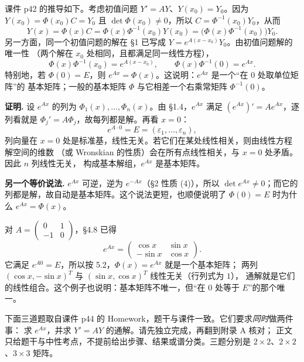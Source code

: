 \documentclass[11pt]{ctexart}
\newcommand{\pmat}[1]{\begin{pmatrix}#1\end{pmatrix}}
\begin{document}
课件 p42 的推导如下。考虑初值问题 $Y'=AY$、$Y(x_0)=Y_0$。因为
$Y(x_0)=\Phi(x_0)C=Y_0$ 且 $\det\Phi(x_0)\ne0$，所以 $C=\Phi^{-1}(x_0)Y_0$，从而
\[
Y(x)=\Phi(x)C=\Phi(x)\Phi^{-1}(x_0)Y(x_0)
=\bigl(\Phi(x)\Phi^{-1}(x_0)\bigr)Y_0 .
\]
另一方面，同一个初值问题的解在 §1 已写成 $Y=e^{A(x-x_0)}Y_0$。由初值问题解的唯一性
（两个解在 $x_0$ 处相同，且都满足同一线性方程），
\begin{equation}\label{eq:PhiExp}
\Phi(x)\Phi^{-1}(x_0)=e^{A(x-x_0)},\qquad
\Phi(x)\Phi^{-1}(0)=e^{Ax}.
\end{equation}
特别地，若 $\Phi(0)=E$，则 $e^{Ax}=\Phi(x)$。这说明：$e^{Ax}$ 是一个“在 $0$ 处取单位矩阵”的
基本矩阵；一般的基本矩阵 $\Phi$ 与它相差一个右乘常矩阵 $\Phi^{-1}(0)$。



\textbf{证明.} 设 $e^{Ax}$ 的列为 $\Phi_1(x),\dots,\Phi_n(x)$。由 §1.4，$e^{Ax}$ 满足
$(e^{Ax})'=Ae^{Ax}$，逐列看就是 $\Phi_j'=A\Phi_j$，故每列都是解。再看 $x=0$：
\[
e^{A\cdot0}=E=(\varepsilon_1,\dots,\varepsilon_n),
\]
列向量在 $x=0$ 处是标准基，线性无关。若它们在某处线性相关，则由线性方程解空间的维数
（或 Wronskian 的性质）会在所有点线性相关，与 $x=0$ 处矛盾。因此 $n$ 列线性无关，
构成基本解组，$e^{Ax}$ 是基本矩阵。

\textbf{另一个等价说法.} $e^{Ax}$ 可逆，逆为 $e^{-Ax}$（§2 性质 (4)），所以
$\det e^{Ax}\ne0$；而它的列都是解，故自动是基本矩阵。这个说法更短，也顺便说明了
$\Phi(0)=E$ 时为什么 $e^{Ax}=\Phi(x)$。


对 $A=\pmat{0&1\\-1&0}$，§4.8 已得
\[
e^{Ax}=\pmat{\cos x&\sin x\\-\sin x&\cos x}.
\]
它满足 $e^{A0}=E$，所以按 5.2，$\Phi(x)=e^{Ax}$ 就是一个基本矩阵；
两列 $(\cos x,-\sin x)^T$ 与 $(\sin x,\cos x)^T$ 线性无关（行列式为 $1$），
通解就是它们的线性组合。这个例子也说明：基本矩阵不唯一，但“在 $0$ 处等于 $E$”的那个唯一。

\flowerrule

\clearpage
{}

下面三道题取自课件 p44 的 Homework，题干与课件一致。它们要求\emph{同时}做两件事：
求 $e^{Ax}$，并求 $Y'=AY$ 的通解。请先独立完成，再翻到附录 A 核对；
正文只给题干与中性考点，不提前给出步骤、结果或谱分类。三题分别是 $2\times2$、$2\times2$、$3\times3$ 矩阵。
\end{document}

